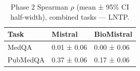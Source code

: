\begin{table}
\caption{Phase 2 Spearman $\rho$ (mean ± 95\% CI half-width), combined tasks — LNTP.}
\label{tab:phase2_spearman_all_lntp}
\begin{tabular}{lll}
\toprule
Task & Mistral & BioMistral \\
\midrule
MedQA & 0.01 ± 0.06 & 0.00 ± 0.06 \\
PubMedQA & 0.37 ± 0.06 & 0.17 ± 0.06 \\
\bottomrule
\end{tabular}
\end{table}
